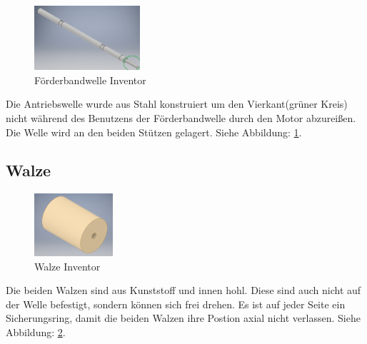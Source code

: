 \begin{figure}
\vspace{-20pt}
  \begin{center}
    \includegraphics[width=0.35\textwidth]{Bilder/Inventor/Antriebs_Welle_Foerderband}
  \end{center}
  \caption{Förderbandwelle Inventor}
  \label{Antriebs_Welle_Foerderband_Inventor}
  \vspace{-30pt}
\end{figure}

Die Antriebswelle wurde aus Stahl konstruiert um den Vierkant(grüner Kreis) nicht während des Benutzens der Förderbandwelle durch den Motor abzureißen. Die Welle wird an den beiden Stützen gelagert. Siehe Abbildung: \ref{Antriebs_Welle_Foerderband_Inventor}.\vspace{60pt}


\subsection{Walze}

\begin{figure}
\vspace{-20pt}
  \begin{center}
    \includegraphics[width=0.26\textwidth]{Bilder/Inventor/Rolle}
  \end{center}
  \caption{Walze Inventor}
  \label{Walze_Inventor}
  \vspace{-20pt}
\end{figure}

Die beiden Walzen sind aus Kunststoff und innen hohl. Diese sind auch nicht auf der Welle befestigt, sondern können sich frei drehen. Es ist auf jeder Seite ein Sicherungsring, damit die beiden Walzen ihre Postion axial nicht verlassen. Siehe Abbildung: \ref{Walze_Inventor}. \\
\newpage


